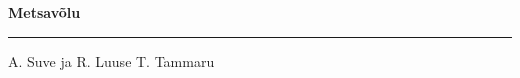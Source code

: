 \documentclass[10pt]{book}
\begin{document}
{
  \samepage
  \raggedbottom
  \raggedright
  \sloppy


  \vspace{0.2in}

  \noindent\begin{minipage}{.1\textwidth}
    \hfill\vspace{0.1in}
  \end{minipage}%
  \noindent\begin{minipage}{.8\textwidth}
    \centering
    \bfseries
    \large Metsav\~olu
  \end{minipage}%
  \noindent\begin{minipage}{.1\textwidth}
      \hfill\vspace{0.1in}
  \end{minipage}

  \nopagebreak[4]
  \vspace{0.1in}
  \nopagebreak[4]
  \hrule height 0.05ex
  \nopagebreak[4]
  \vspace{-0.05in}

  {\footnotesize A. Suve ja R. Luuse \hfill T. Tammaru }\\
  \vspace{0.01in}



}
\end{document}
